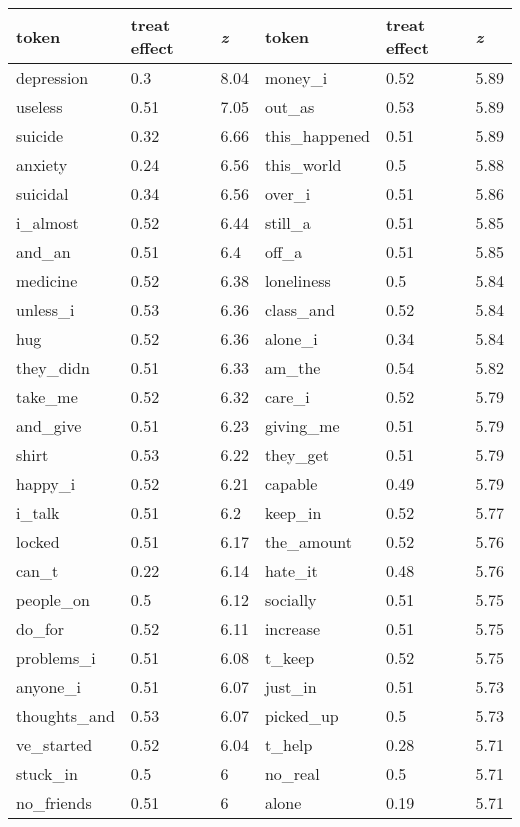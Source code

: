 \begin{table}[h!]
\noindent\begin{tabularx}{\textwidth}{XXX|XXX}
\toprule
token & treat effect & \textit{z} & token & treat effect & \textit{z} \\
\midrule
depression & 0.3 &  8.04 & money\_i & 0.52 & 5.89\\ 
useless & 0.51 &  7.05 & out\_as & 0.53 & 5.89\\ 
suicide & 0.32 &  6.66 & this\_happened & 0.51 & 5.89\\ 
anxiety & 0.24 &  6.56 & this\_world & 0.5 & 5.88\\ 
suicidal & 0.34 &  6.56 & over\_i & 0.51 & 5.86\\ 
i\_almost & 0.52 &  6.44 & still\_a & 0.51 & 5.85\\ 
and\_an & 0.51 &  6.4 & off\_a & 0.51 & 5.85\\ 
medicine & 0.52 &  6.38 & loneliness & 0.5 & 5.84\\ 
unless\_i & 0.53 &  6.36 & class\_and & 0.52 & 5.84\\ 
hug & 0.52 &  6.36 & alone\_i & 0.34 & 5.84\\ 
they\_didn & 0.51 &  6.33 & am\_the & 0.54 & 5.82\\ 
take\_me & 0.52 &  6.32 & care\_i & 0.52 & 5.79\\ 
and\_give & 0.51 &  6.23 & giving\_me & 0.51 & 5.79\\
shirt & 0.53 &  6.22 & they\_get & 0.51 & 5.79\\ 
happy\_i & 0.52 &  6.21 & capable & 0.49 & 5.79\\ 
i\_talk & 0.51 &  6.2 & keep\_in & 0.52 & 5.77\\ 
locked & 0.51 &  6.17 & the\_amount & 0.52 & 5.76\\ 
can\_t & 0.22 &  6.14 & hate\_it & 0.48 & 5.76\\ 
people\_on & 0.5 &  6.12 & socially & 0.51 & 5.75\\ 
do\_for & 0.52 &  6.11 & increase & 0.51 & 5.75\\ 
problems\_i & 0.51 &  6.08 & t\_keep & 0.52 & 5.75\\ 
anyone\_i & 0.51 &  6.07 & just\_in & 0.51 & 5.73\\
thoughts\_and & 0.53 &  6.07 & picked\_up & 0.5 & 5.73\\ 
ve\_started & 0.52 &  6.04 & t\_help & 0.28 & 5.71\\ 
stuck\_in & 0.5 &  6 & no\_real & 0.5 & 5.71\\ 
no\_friends & 0.51 &  6& alone & 0.19 & 5.71\\ 

\end{tabularx}
\end{table}
